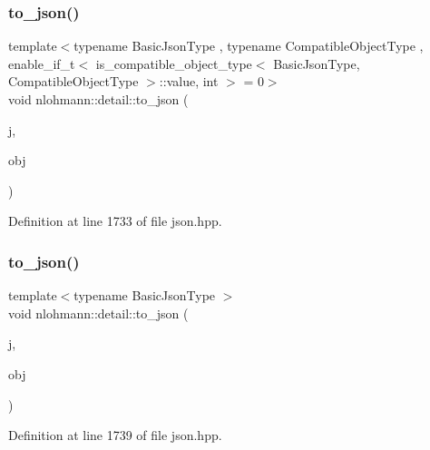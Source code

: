\mbox{\label{namespacenlohmann_1_1detail_a24c9c12f3839c94e09532f08de85e949}} 
\subsubsection{\texorpdfstring{to\+\_\+json()}{to\_json()}\hspace{0.1cm}{\footnotesize\ttfamily [12/16]}}
{\footnotesize\ttfamily template$<$typename Basic\+Json\+Type , typename Compatible\+Object\+Type , enable\+\_\+if\+\_\+t$<$ is\+\_\+compatible\+\_\+object\+\_\+type$<$ Basic\+Json\+Type, Compatible\+Object\+Type $>$\+::value, int $>$  = 0$>$ \\
void nlohmann\+::detail\+::to\+\_\+json (\begin{DoxyParamCaption}\item[{Basic\+Json\+Type \&}]{j,  }\item[{const Compatible\+Object\+Type \&}]{obj }\end{DoxyParamCaption})}



Definition at line 1733 of file json.\+hpp.

\mbox{\label{namespacenlohmann_1_1detail_ac9f7a5542851c61d93740148eaec509f}} 
\subsubsection{\texorpdfstring{to\+\_\+json()}{to\_json()}\hspace{0.1cm}{\footnotesize\ttfamily [13/16]}}
{\footnotesize\ttfamily template$<$typename Basic\+Json\+Type $>$ \\
void nlohmann\+::detail\+::to\+\_\+json (\begin{DoxyParamCaption}\item[{Basic\+Json\+Type \&}]{j,  }\item[{typename Basic\+Json\+Type\+::object\+\_\+t \&\&}]{obj }\end{DoxyParamCaption})}



Definition at line 1739 of file json.\+hpp.

